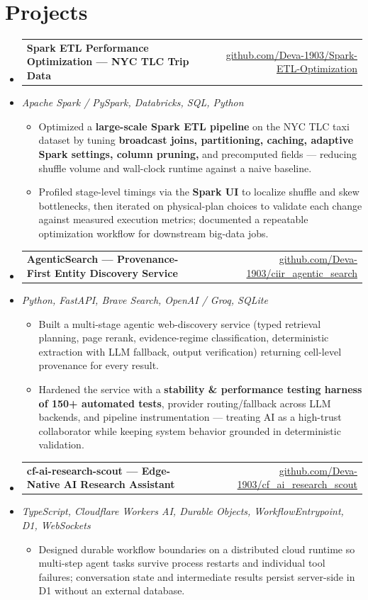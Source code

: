 \documentclass[letterpaper,10pt]{article}
\makeatletter
\newcommand{\resumeItem}[1]{
  \item\small{#1\vspace{-1pt}}
}
\newcommand{\resumeProjectHeading}[2]{
    \item
    \begin{tabular*}{0.985\textwidth}[t]{l@{\extracolsep{\fill}}r}
      \small\textbf{#1} & \small #2 \\
    \end{tabular*}\vspace{-5pt}
}
\newcommand{\resumeProjectSubheading}[1]{
  \vspace{-2pt}\item[] {\small\textcolor{ResumeSlate}{\emph{#1}}}\vspace{-3pt}
}
\newcommand{\resumeSubHeadingListStart}{\begin{itemize}[leftmargin=0.0in, label={}, itemsep=2pt, topsep=2pt]}
\newcommand{\resumeSubHeadingListEnd}{\end{itemize}}
\newcommand{\resumeItemListStart}{\begin{itemize}[leftmargin=0.18in, itemsep=2pt, topsep=1pt]}
\newcommand{\resumeItemListEnd}{\end{itemize}\vspace{-4pt}}
\makeatother
\begin{document}
\section{Projects}
\resumeSubHeadingListStart
  \resumeProjectHeading
    {Spark ETL Performance Optimization --- NYC TLC Trip Data}
    {\href{https://github.com/Deva-1903/Spark-ETL-Optimization}{github.com/Deva-1903/Spark-ETL-Optimization}}
  \resumeProjectSubheading{Apache Spark / PySpark, Databricks, SQL, Python}
    \resumeItemListStart
      \resumeItem{Optimized a \textbf{large-scale Spark ETL pipeline} on the NYC TLC taxi dataset by tuning \textbf{broadcast joins, partitioning, caching, adaptive Spark settings, column pruning,} and precomputed fields --- reducing shuffle volume and wall-clock runtime against a naive baseline.}
      \resumeItem{Profiled stage-level timings via the \textbf{Spark UI} to localize shuffle and skew bottlenecks, then iterated on physical-plan choices to validate each change against measured execution metrics; documented a repeatable optimization workflow for downstream big-data jobs.}
    \resumeItemListEnd
  \resumeProjectHeading
    {AgenticSearch --- Provenance-First Entity Discovery Service}
    {\href{https://github.com/Deva-1903/ciir_agentic_search}{github.com/Deva-1903/ciir\_agentic\_search}}
  \resumeProjectSubheading{Python, FastAPI, Brave Search, OpenAI / Groq, SQLite}
    \resumeItemListStart
      \resumeItem{Built a multi-stage agentic web-discovery service (typed retrieval planning, page rerank, evidence-regime classification, deterministic extraction with LLM fallback, output verification) returning cell-level provenance for every result.}
      \resumeItem{Hardened the service with a \textbf{stability \& performance testing harness of 150+ automated tests}, provider routing/fallback across LLM backends, and pipeline instrumentation --- treating AI as a high-trust collaborator while keeping system behavior grounded in deterministic validation.}
    \resumeItemListEnd
  \resumeProjectHeading
    {cf-ai-research-scout --- Edge-Native AI Research Assistant}
    {\href{https://github.com/Deva-1903/cf_ai_research_scout}{github.com/Deva-1903/cf\_ai\_research\_scout}}
  \resumeProjectSubheading{TypeScript, Cloudflare Workers AI, Durable Objects, WorkflowEntrypoint, D1, WebSockets}
    \resumeItemListStart
      \resumeItem{Designed durable workflow boundaries on a distributed cloud runtime so multi-step agent tasks survive process restarts and individual tool failures; conversation state and intermediate results persist server-side in D1 without an external database.}
    \resumeItemListEnd
\resumeSubHeadingListEnd
\vspace{-4pt}
\end{document}
